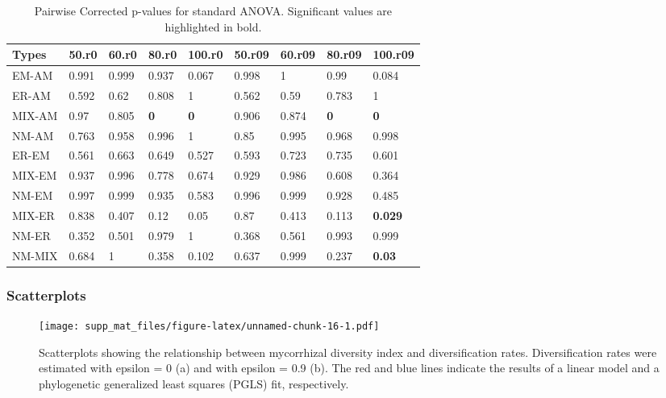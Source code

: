 \documentclass[]{article}
\begin{document}
\begin{table}[H]

\caption{\label{tab:unnamed-chunk-15}Pairwise Corrected p-values for standard ANOVA. Significant values are highlighted in bold.}
\centering
\begin{tabular}{l|l|l|l|l|l|l|l|l}
\hline
Types & 50.r0 & 60.r0 & 80.r0 & 100.r0 & 50.r09 & 60.r09 & 80.r09 & 100.r09\\
\hline
EM-AM & 0.991 & 0.999 & 0.937 & 0.067 & 0.998 & 1 & 0.99 & 0.084\\
\hline
ER-AM & 0.592 & 0.62 & 0.808 & 1 & 0.562 & 0.59 & 0.783 & 1\\
\hline
MIX-AM & 0.97 & 0.805 & \textbf{0} & \textbf{0} & 0.906 & 0.874 & \textbf{0} & \textbf{0}\\
\hline
NM-AM & 0.763 & 0.958 & 0.996 & 1 & 0.85 & 0.995 & 0.968 & 0.998\\
\hline
ER-EM & 0.561 & 0.663 & 0.649 & 0.527 & 0.593 & 0.723 & 0.735 & 0.601\\
\hline
MIX-EM & 0.937 & 0.996 & 0.778 & 0.674 & 0.929 & 0.986 & 0.608 & 0.364\\
\hline
NM-EM & 0.997 & 0.999 & 0.935 & 0.583 & 0.996 & 0.999 & 0.928 & 0.485\\
\hline
MIX-ER & 0.838 & 0.407 & 0.12 & 0.05 & 0.87 & 0.413 & 0.113 & \textbf{0.029}\\
\hline
NM-ER & 0.352 & 0.501 & 0.979 & 1 & 0.368 & 0.561 & 0.993 & 0.999\\
\hline
NM-MIX & 0.684 & 1 & 0.358 & 0.102 & 0.637 & 0.999 & 0.237 & \textbf{0.03}\\
\hline
\end{tabular}
\end{table}

\hypertarget{scatterplots-1}{%
\subsubsection{Scatterplots}\label{scatterplots-1}}

\begin{figure}
\centering
\texttt{[image: supp\_mat\_files/figure-latex/unnamed-chunk-16-1.pdf]}
\caption{Scatterplots showing the relationship between mycorrhizal
diversity index and diversification rates. Diversification rates were
estimated with epsilon = 0 (a) and with epsilon = 0.9 (b). The red and
blue lines indicate the results of a linear model and a phylogenetic
generalized least squares (PGLS) fit, respectively.}
\end{figure}
\end{document}
